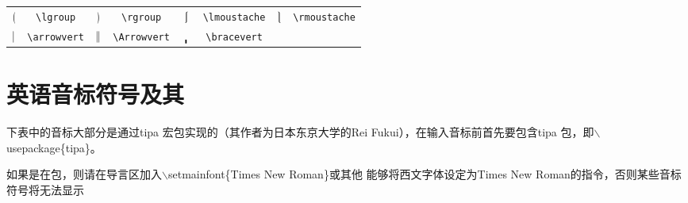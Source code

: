 \begin{table}[H]
\centering
\begin{tabular}{*{8}{c}}
$\lgroup $ & \verb|\lgroup| &$\rgroup $ & \verb|\rgroup| &$\lmoustache $ & \verb|\lmoustache| &$ \rmoustache$ & \verb|\rmoustache| \\
$\arrowvert $ & \verb|\arrowvert| &$\Arrowvert $ & \verb|\Arrowvert| &$\bracevert $ & \verb|\bracevert| & &
\end{tabular}
\end{table}



\section{英语音标符号及其}
\song\wuhao
下表中的音标大部分是通过tipa 宏包实现的（其作者为日本东京大学的Rei Fukui），在输入音标前首先要包含tipa 包，即$\backslash$usepackage\{tipa\}。

如果是在 包，则请在导言区加入$\backslash$setmainfont\{Times New Roman\}或其他
能够将西文字体设定为Times New Roman的指令，否则某些音标符号将无法显示

